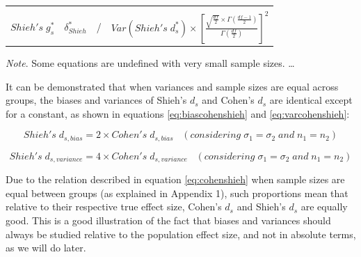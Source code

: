 \documentclass[
  man,floatsintext]{apa6}
\begin{document}
\begin{landscape}
\begin{longtable}[]{@{}lccc@{}}
\begin{minipage}[t]{0.19\columnwidth}
\strut
\end{minipage} & \begin{minipage}[t]{0.50\columnwidth}\centering
\strut
\end{minipage}\tabularnewline
\begin{minipage}[t]{0.04\columnwidth}\raggedright
\tiny\(Shieh's \; g^*_s\)\strut
\end{minipage} & \begin{minipage}[t]{0.16\columnwidth}\centering
\tiny\(\delta^*_{Shieh}\)\strut
\end{minipage} & \begin{minipage}[t]{0.19\columnwidth}\centering
/\strut
\end{minipage} & \begin{minipage}[t]{0.50\columnwidth}\centering
\tiny\(Var(Shieh's \; d^*_s) \times \left[\frac{\sqrt{\frac{df}{2}} \times \Gamma(\frac{df-1}{2})}{\Gamma(\frac{df}{2})}\right]^2\)\strut
\end{minipage}\tabularnewline
\bottomrule
\end{longtable}

\emph{Note}. Some equations are undefined with very small sample sizes. \ldots{}

\end{landscape}

\newpage

It can be demonstrated that when variances and sample sizes are equal across groups, the biases and variances of Shieh's \(d_s\) and Cohen's \(d_s\) are identical except for a constant, as shown in equations \ref{eq:biascohenshieh} and \ref{eq:varcohenshieh}:

\begin{equation} 
Shieh's \; d_{s,bias} = 2 \times Cohen's \; d_{s,bias} \;\;\;(considering \; \sigma_1 = \sigma_2 \; and \; n_1 = n_2)
\label{eq:biascohenshieh}
\end{equation}

\begin{equation} 
Shieh's \; d_{s,variance} = 4 \times Cohen's \; d_{s,variance} \;\;\;(considering \; \sigma_1 = \sigma_2 \; and \; n_1 = n_2)
\label{eq:varcohenshieh}
\end{equation}

Due to the relation described in equation \ref{eq:cohenshieh} when sample sizes are equal between groups (as explained in Appendix 1), such proportions mean that relative to their respective true effect size, Cohen's \(d_s\) and Shieh's \(d_s\) are equally good. This is a good illustration of the fact that biases and variances should always be studied relative to the population effect size, and not in absolute terms, as we will do later.
\end{document}
